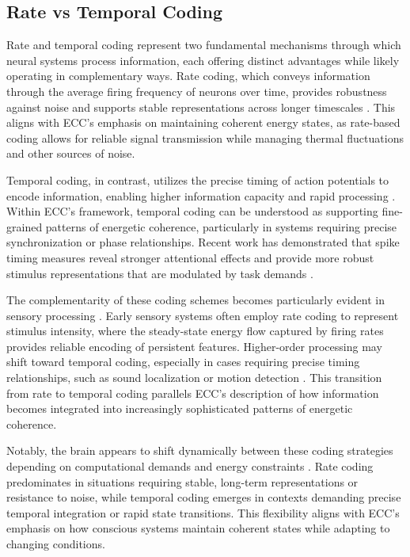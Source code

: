 \subsection{Rate vs Temporal Coding}

Rate and temporal coding represent two fundamental mechanisms through which neural systems process information, each offering distinct advantages while likely operating in complementary ways. Rate coding, which conveys information through the average firing frequency of neurons over time, provides robustness against noise and supports stable representations across longer timescales \cite{kumar2010spiking}. This aligns with ECC's emphasis on maintaining coherent energy states, as rate-based coding allows for reliable signal transmission while managing thermal fluctuations and other sources of noise.

Temporal coding, in contrast, utilizes the precise timing of action potentials to encode information, enabling higher information capacity and rapid processing \cite{panzeri2010sensory}. Within ECC's framework, temporal coding can be understood as supporting fine-grained patterns of energetic coherence, particularly in systems requiring precise synchronization or phase relationships. Recent work has demonstrated that spike timing measures reveal stronger attentional effects and provide more robust stimulus representations that are modulated by task demands \cite{zhang2023adaptive}.

The complementarity of these coding schemes becomes particularly evident in sensory processing \cite{buzsaki2004neuronal}. Early sensory systems often employ rate coding to represent stimulus intensity, where the steady-state energy flow captured by firing rates provides reliable encoding of persistent features. Higher-order processing may shift toward temporal coding, especially in cases requiring precise timing relationships, such as sound localization or motion detection \cite{womelsdorf2007modulation}. This transition from rate to temporal coding parallels ECC's description of how information becomes integrated into increasingly sophisticated patterns of energetic coherence.

Notably, the brain appears to shift dynamically between these coding strategies depending on computational demands and energy constraints \cite{lisman2013theta}. Rate coding predominates in situations requiring stable, long-term representations or resistance to noise, while temporal coding emerges in contexts demanding precise temporal integration or rapid state transitions. This flexibility aligns with ECC's emphasis on how conscious systems maintain coherent states while adapting to changing conditions.

